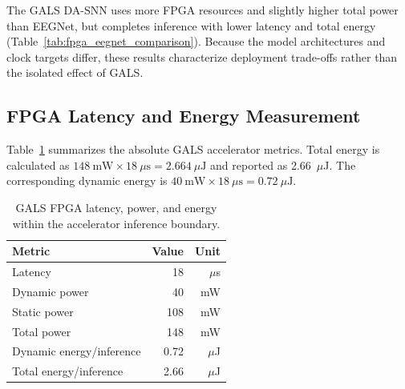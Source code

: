 \documentclass[12pt]{article}
\begin{document}
The GALS DA-SNN uses more FPGA resources and slightly higher total power than EEGNet, but completes inference with lower latency and total energy (Table~\ref{tab:fpga_eegnet_comparison}). Because the model architectures and clock targets differ, these results characterize deployment trade-offs rather than the isolated effect of GALS.

\subsection{FPGA Latency and Energy Measurement}

Table~\ref{tab:power_comparison} summarizes the absolute GALS accelerator metrics. Total energy is calculated as $148~\mathrm{mW}\times18~\mu\mathrm{s}=2.664~\mu\mathrm{J}$ and reported as 2.66~$\mu$J. The corresponding dynamic energy is $40~\mathrm{mW}\times18~\mu\mathrm{s}=0.72~\mu\mathrm{J}$.

\begin{table}[!htbp]
\centering
\caption{GALS FPGA latency, power, and energy within the accelerator inference boundary.}
\label{tab:power_comparison}
\footnotesize
\renewcommand{\arraystretch}{1.2}
\setlength{\tabcolsep}{4pt}
\begin{tabular}{@{}lrr@{}}
\toprule
 Metric &  Value &  Unit \\
\midrule
Latency &  18 &  $\mu$s \\
 Dynamic power & 40 & mW \\
 Static power & 108 & mW \\
 Total power & 148 & mW \\
 Dynamic energy/inference & 0.72 & $\mu$J \\
Total energy/inference & 2.66 & $\mu$J \\
\bottomrule
\end{tabular}
\end{table}
\end{document}
